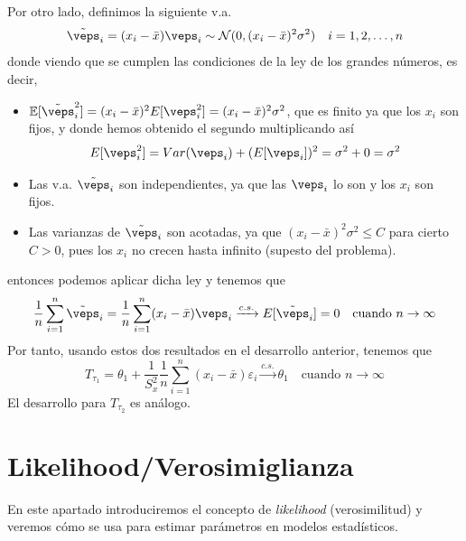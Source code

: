 \noindent
Por otro lado, definimos la siguiente v.a.
\begin{equation*}
    \tilde{\veps}_i=(x_i - \bar{x}) \veps_i\sim \cc{N}(0,(x_i-\bar{x})^2\sigma^2) \quad i=1,2,\ldots,n
\end{equation*}
donde viendo que se cumplen las condiciones de la ley de los grandes números, es decir, 
\begin{itemize}
    \item $\E[\tilde{\veps}_i^2] = (x_i - \bar{x})^2 E[\veps_i^2] = (x_i - \bar{x})^2\sigma^2$, que es finito ya que los $x_i$ son fijos, y donde hemos obtenido el segundo multiplicando así
    \begin{equation*}
        E[\veps_i^2] = Var(\veps_i) + (E[\veps_i])^2 = \sigma^2 + 0 = \sigma^2
    \end{equation*}
    \item Las v.a. $\tilde{\veps}_i$ son independientes, ya que las $\veps_i$ lo son y los $x_i$ son fijos.
    \item Las varianzas de $\tilde{\veps}_i$ son acotadas, ya que $(x_i - \bar{x})^2\sigma^2 \leq C$ para cierto $C>0$, pues los $x_i$ no crecen hasta infinito (supesto del problema).
\end{itemize}
entonces podemos aplicar dicha ley y tenemos que
\begin{equation*}
    \dfrac{1}{n} \sum\limits_{i=1}^{n} \tilde{\veps}_i = \dfrac{1}{n} \sum\limits_{i=1}^{n} (x_i - \bar{x}) \veps_i \xrightarrow{c.s.} E[\tilde{\veps}_i] = 0 \quad \text{cuando } n\to \infty
\end{equation*}
Por tanto, usando estos dos resultados en el desarrollo anterior, tenemos que
\begin{equation*}
    T_{\tau_1} = \theta_1 + \dfrac{1}{S_x^2}\frac{1}{n} \sum\limits_{i=1}^{n} (x_i-\bar{x})\varepsilon_i \xrightarrow{c.s.} \theta_1 \quad \text{cuando } n\to \infty
\end{equation*}
El desarrollo para $T_{\tau_2}$ es análogo.

\section{Likelihood/Verosimiglianza}
En este apartado introduciremos el concepto de \textit{likelihood} (verosimilitud) y veremos cómo se usa para estimar parámetros en modelos estadísticos. \\

